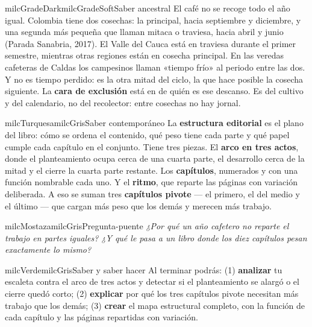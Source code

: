 \documentclass[11pt,letterpaper]{article}
\begin{document}
\begin{softbox}{milcGradeDark}{milcGradeSoft}{Saber ancestral}
El café no se recoge todo el año igual. Colombia tiene dos cosechas: la principal, hacia septiembre y diciembre, y una segunda más pequeña que llaman mitaca o traviesa, hacia abril y junio (Parada Sanabria, 2017). El Valle del Cauca está en traviesa durante el primer semestre, mientras otras regiones están en cosecha principal. En las veredas cafeteras de Caldas los campesinos llaman «tiempo frío» al periodo entre las dos. Y no es tiempo perdido: es la otra mitad del ciclo, la que hace posible la cosecha siguiente. La \textbf{cara de exclusión} está en de quién es ese descanso. Es del cultivo y del calendario, no del recolector: entre cosechas no hay jornal.\par{}
\end{softbox}

\begin{softbox}{milcTurquesa}{milcGris}{Saber contemporáneo}
La \textbf{estructura editorial} es el plano del libro: cómo se ordena el contenido, qué peso tiene cada parte y qué papel cumple cada capítulo en el conjunto. Tiene tres piezas. El \textbf{arco en tres actos}, donde el planteamiento ocupa cerca de una cuarta parte, el desarrollo cerca de la mitad y el cierre la cuarta parte restante. Los \textbf{capítulos}, numerados y con una función nombrable cada uno. Y el \textbf{ritmo}, que reparte las páginas con variación deliberada. A eso se suman tres \textbf{capítulos pivote} --- el primero, el del medio y el último --- que cargan más peso que los demás y merecen más trabajo.
\end{softbox}

\begin{softbox}{milcMostaza}{milcGris}{Pregunta-puente}
\textit{¿Por qué un año cafetero no reparte el trabajo en partes iguales? ¿Y qué le pasa a un libro donde los diez capítulos pesan exactamente lo mismo?}
\end{softbox}

\begin{softbox}{milcVerde}{milcGris}{Saber y saber hacer}
Al terminar podrás: (1) \textbf{analizar} tu escaleta contra el arco de tres actos y detectar si el planteamiento se alargó o el cierre quedó corto; (2) \textbf{explicar} por qué los tres capítulos pivote necesitan más trabajo que los demás; (3) \textbf{crear} el mapa estructural completo, con la función de cada capítulo y las páginas repartidas con variación.
\end{softbox}
\end{document}
